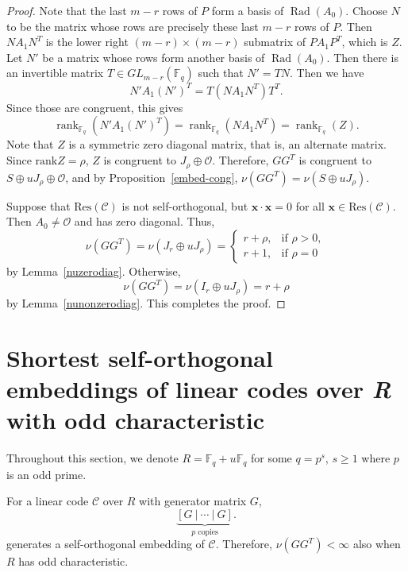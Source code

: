 \documentclass{article}
\theoremstyle{definition}
\theoremstyle{remark}
\begin{document}
\begin{proof}
    Note that the last $m-r$ rows of $P$ form a basis of $\operatorname{Rad}(A_0)$. Choose $N$ to be the matrix whose rows are precisely these last $m-r$ rows of $P$. Then $NA_1N^T$ is the lower right $(m-r)\times (m-r)$ submatrix of $PA_1P^T$, which is $Z$. Let $N'$ be a matrix whose rows form another basis of $\operatorname{Rad}(A_0)$. Then there is an invertible matrix $T\in GL_{m-r}(\mathbb{F}_q)$ such that $N'=TN$. Then we have
    \[
    N'A_1(N')^T=T(NA_1N^T)T^T.
    \]
    Since those are congruent, this gives
    \[
    \operatorname{rank}_{\mathbb{F}_q}(N'A_1(N')^T)=\operatorname{rank}_{\mathbb{F}_q}(NA_1N^T)=\operatorname{rank}_{\mathbb{F}_q}(Z).
    \]
    Note that $Z$ is a symmetric zero diagonal matrix, that is, an alternate matrix. Since $\mathrm{rank} Z=\rho$, $Z$ is congruent to $J_\rho\oplus \mathcal{O}$. Therefore, $GG^T$ is congruent to $S\oplus uJ_\rho\oplus \mathcal{O}$, and by Proposition~\ref{embed-cong}, $\nu(GG^T)=\nu(S\oplus uJ_\rho)$.

    Suppose that $\mathrm{Res}(\mathcal{C})$ is not self-orthogonal, but $\mathbf{x}\cdot\mathbf{x}=0$ for all $\mathbf{x}\in\mathrm{Res}(\mathcal{C})$. Then $A_0\ne \mathcal{O}$ and has zero diagonal. Thus,
    \[
    \nu(GG^T)=\nu(J_r\oplus u J_\rho)=\begin{cases}
        r+\rho, & \mbox{if }\rho>0,\\
        r+1, & \mbox{if }\rho=0
    \end{cases}
    \]
    by Lemma~\ref{nuzerodiag}. Otherwise,
    \[
    \nu(GG^T)=\nu(I_r\oplus u J_\rho)=r+\rho
    \]
    by Lemma~\ref{nunonzerodiag}. This completes the proof.
\end{proof}

\section{Shortest self-orthogonal embeddings of linear codes over {\it R} with odd characteristic}\label{sec4}
Throughout this section, we denote $R=\mathbb{F}_q+u\mathbb{F}_q$ for some $q=p^s$, $s\ge 1$ where $p$ is an odd prime.

For a linear code $\mathcal{C}$ over $R$ with generator matrix $G$, 
\[
\underbrace{\left[
G~|~
\cdots
~|~G
\right]}_{p\text{ copies}}.
\]
generates a self-orthogonal embedding of $\mathcal{C}$. Therefore, $\nu(GG^T)<\infty$ also when $R$ has odd characteristic.
\end{document}
